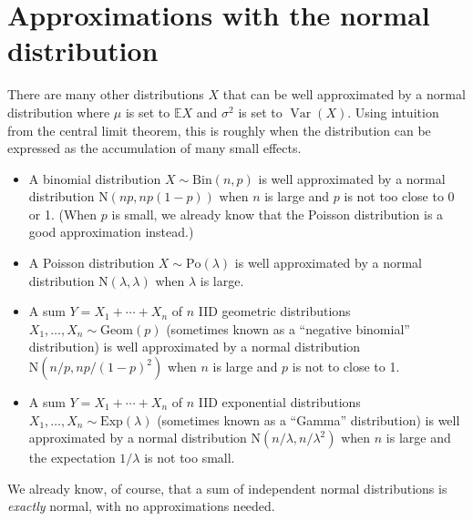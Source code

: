 \documentclass[
  a4paper,
]{book}
\theoremstyle{definition}
\theoremstyle{definition}
\theoremstyle{definition}
\theoremstyle{definition}
\theoremstyle{remark}
\begin{document}
\hypertarget{normal-approx}{%
\section{Approximations with the normal distribution}\label{normal-approx}}

There are many other distributions \(X\) that can be well approximated by a normal distribution where \(\mu\) is set to \(\mathbb EX\) and \(\sigma^2\) is set to \(\operatorname{Var}(X)\). Using intuition from the central limit theorem, this is roughly when the distribution can be expressed as the accumulation of many small effects.

\begin{itemize}
\item
  A binomial distribution \(X \sim \mathrm{Bin}(n, p)\) is well approximated by a normal distribution \(\mathrm{N}(np, np(1-p))\) when \(n\) is large and \(p\) is not too close to 0 or 1. (When \(p\) is small, we already know that the Poisson distribution is a good approximation instead.)
\item
  A Poisson distribution \(X \sim \mathrm{Po}(\lambda)\) is well approximated by a normal distribution \(\mathrm{N}(\lambda, \lambda)\) when \(\lambda\) is large.
\item
  A sum \(Y = X_1 + \cdots + X_n\) of \(n\) IID geometric distributions \(X_1, \dots, X_n \sim \mathrm{Geom}(p)\) (sometimes known as a ``negative binomial'' distribution) is well approximated by a normal distribution \(\mathrm{N}(n/p, np/(1-p)^2)\) when \(n\) is large and \(p\) is not to close to 1.
\item
  A sum \(Y = X_1 + \cdots + X_n\) of \(n\) IID exponential distributions \(X_1, \dots, X_n \sim \mathrm{Exp}(\lambda)\) (sometimes known as a ``Gamma'' distribution) is well approximated by a normal distribution \(\mathrm{N}(n/\lambda, n/\lambda^2)\) when \(n\) is large and the expectation \(1/\lambda\) is not too small.
\end{itemize}

We already know, of course, that a sum of independent normal distributions is \emph{exactly} normal, with no approximations needed.
\end{document}
